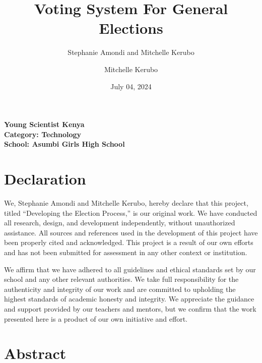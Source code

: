 \documentclass[
  12pt,
]{article}
\title{Voting System For General Elections}
\author{Stephanie Amondi and Mitchelle Kerubo \and Mitchelle Kerubo}
\date{July 04, 2024}
\begin{document}
\maketitle

{
\setcounter{tocdepth}{2}
\tableofcontents
}
\usepackage{times}
\renewcommand{\familydefault}{\sfdefault}
\begin{center}
  \huge\textbf{Young Scientist Kenya} \\
  \vspace{0.5cm}
  \Large\textbf{Category: Technology} \\
  \vspace{0.5cm}
  \large\textbf{School: Asumbi Girls High School} \\
\end{center}

\section{Declaration}\label{declaration}

We, Stephanie Amondi and Mitchelle Kerubo, hereby declare that this
project, titled ``Developing the Election Process,'' is our original
work. We have conducted all research, design, and development
independently, without unauthorized assistance. All sources and
references used in the development of this project have been properly
cited and acknowledged. This project is a result of our own efforts and
has not been submitted for assessment in any other context or
institution.

We affirm that we have adhered to all guidelines and ethical standards
set by our school and any other relevant authorities. We take full
responsibility for the authenticity and integrity of our work and are
committed to upholding the highest standards of academic honesty and
integrity. We appreciate the guidance and support provided by our
teachers and mentors, but we confirm that the work presented here is a
product of our own initiative and effort.

\newpage

\section{Abstract}\label{abstract}
\end{document}
